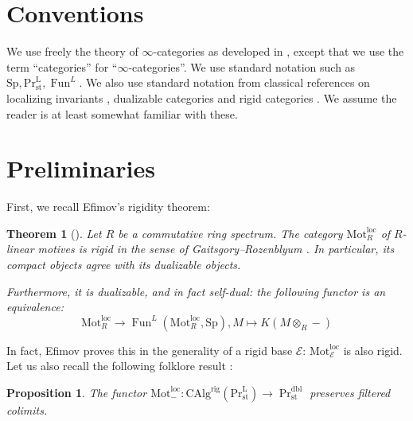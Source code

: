 \documentclass{article}
\newtheorem{thm}{Theorem}[section]
\newtheorem{prop}[prop]{Proposition}
\theoremstyle{definition}
\newcommand{\cat}{\mathrm}
\newcommand{\on}{\operatorname}
\newcommand{\Fun}{\on{Fun}}
\newcommand{\Sp}{\cat{Sp}}
\newcommand{\PrL}{\mathrm{Pr}^\mathrm{L} }
\newcommand{\CAlg}{\mathrm{CAlg}}
\newcommand{\Mot}{\cat{Mot}^{\mathrm{loc}}}
\newcommand{\st}{\mathrm{st}}
\newcommand{\dbl}{\mathrm{dbl}}
\begin{document}
\section*{Conventions}
We use freely the theory of $\infty$-categories as developed in \cite{HTT,HA}, except that we use the term ``categories'' for ``$\infty$-categories''. We use standard notation such as $\Sp, \PrL_\st, \Fun^L$. We also use standard notation from classical references on localizing invariants \cite{BGT,efimov}, dualizable categories \cite{Dbl,efimov} and rigid categories \cite{locrig}.  We assume the reader is at least somewhat familiar with these. 
\section{Preliminaries}
First, we recall Efimov's rigidity theorem: 
\begin{thm}[{\cite[Theorem 0.3]{rigidity}}]\label{thm:rigidity}
Let $R$ be a commutative ring spectrum. The category $\Mot_R$ of $R$-linear motives is rigid in the sense of Gaitsgory--Rozenblyum \cite{GR}. In particular, its compact objects agree with its dualizable objects. 

Furthermore, it is dualizable, and in fact self-dual: the following functor is an equivalence: $$\Mot_R\to \Fun^L(\Mot_R,\Sp), M\mapsto K(M\otimes_R -)$$
\end{thm}
In fact, Efimov proves this in the generality of a rigid base $\mathcal E$: $\Mot_\mathcal E$ is also rigid. Let us also recall the following folklore result : 
\begin{prop}
    The functor $\Mot_{-}:\CAlg^{\mathrm{rig}}(\PrL_\st)\to \Pr^\dbl_\st$ preserves filtered colimits. 
\end{prop}
\end{document}
